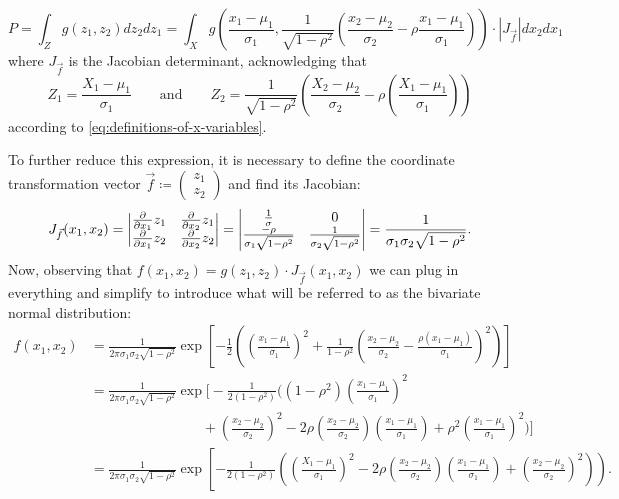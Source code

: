 \begin{equation}
   P = \int_{Z} g(z_1,z_2)dz_2 dz_1= \int_{X} g(\frac{x_1-\mu_1}{\sigma_1},\frac{1}{\sqrt{1-\rho^2}}(\frac{x_2-\mu_2}{\sigma_2}-\rho\frac{x_1-\mu_1}{\sigma_1}))\cdot|J_{\vec{f}}|dx_2 dx_1
    \label{eq:change_of_variables_formula}
\end{equation}
where $J_{\vec{f}}$ is the Jacobian determinant, acknowledging that
\begin{equation}
    Z_1=\frac{X_1-\mu_1}{\sigma_1} \qquad
    \text{and}\qquad
    Z_2=\frac{1}{\sqrt{1-\rho^2}}\left(\frac{X_2-\mu_2}{\sigma_2}-\rho \left(\frac{X_1-\mu_1}{\sigma_1}\right)\right)
    \label{eq:z-vars-in-x-terms}
\end{equation}
according to \eqref{eq:definitions-of-x-variables}.

To further reduce this expression, it is necessary to define the coordinate transformation vector $\vec{f}\coloneqq\begin{pmatrix}z_1\\z_2\end{pmatrix}$ and find its Jacobian:
\begin{equation}
    J_{\vec{f}}(x_1,x_2)=
    \begin{vmatrix} 
        \frac{\partial}{\partial x_1}z_1 & \frac{\partial}{\partial{x_2}}z_1\\ \frac{\partial}{\partial{x_1}}z_2 & \frac{\partial}{\partial{x_2}}{z_2}
     \end{vmatrix}=
    \begin{vmatrix} 
        \frac{1}{\sigma} & 0 \\
        \frac{-\rho}{\sigma_1\sqrt{1-\rho^2}} & \frac{1}{\sigma_2\sqrt{1-\rho^2}}
     \end{vmatrix}
    =\frac{1}{\sigma_1\sigma_2\sqrt{1-\rho^2}}.
    \label{eq:jacobian-determinant}
\end{equation}
Now, observing that $f(x_1,x_2)=g(z_1,z_2)\cdot J_{\vec{f}}(x_1,x_2) $ we can plug in everything and simplify to introduce what will be referred to as the bivariate normal distribution:
\small
\begin{align*}
    f(x_1,x_2)&=\frac{1}{2\pi\sigma_1\sigma_2\sqrt{1-\rho^2}}
    \exp\left[
        -\frac{1}{2} \left(
            \left( \frac{x_1-\mu_1}{\sigma_1} \right)^2
            +
             \frac{1}{{1-\rho^2}}\left( \frac{x_2-\mu_2}{\sigma_2}-\frac{\rho(x_1-\mu_1)}{\sigma_1} \right)^2
        \right)
    \right]\\
    &=\frac{1}{2\pi\sigma_1\sigma_2\sqrt{1-\rho^2}}
    \exp\Bigg[
        -\frac{1}{2(1-\rho^2)} \bigg(
            (1-\rho^2)\left( \frac{x_1-\mu_1}{\sigma_1} \right)^2 \\
            &\qquad\qquad\qquad\qquad + \left( \frac{x_2-\mu_2}{\sigma_2} \right)^2
            -2\rho\left( \frac{x_2-\mu_2}{\sigma_2} \right) \left( \frac{x_1-\mu_1}{\sigma_1} \right)
            +\rho^2\left( \frac{x_1-\mu_1}{\sigma_1} \right)^2
        \bigg)
    \Bigg]\\
    &=\frac{1}{2\pi\sigma_1\sigma_2\sqrt{1-\rho^2}}
    \exp\left[
        -\frac{1}{2(1-\rho^2)} \left(
            \left( \frac{X_1-\mu_1}{\sigma_1} \right)^2
            -2\rho\left( \frac{x_2-\mu_2}{\sigma_2} \right) \left( \frac{x_1-\mu_1}{\sigma_1} \right)
            +
            \left( \frac{x_2-\mu_2}{\sigma_2} \right)^2
        \right)
    \right).
\end{align*}

